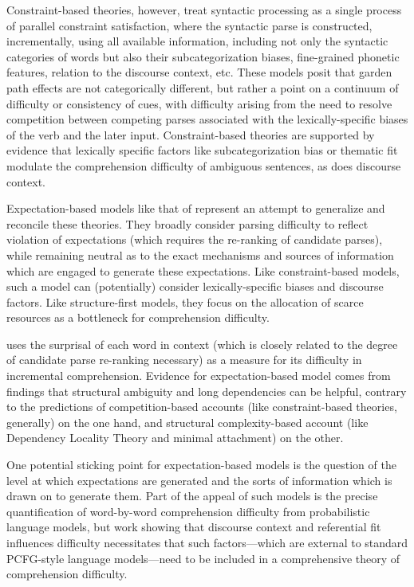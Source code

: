 \documentclass[11pt]{article}
\begin{document}
Constraint-based theories, however, treat syntactic processing as a single process of parallel constraint satisfaction, where the syntactic parse is constructed, incrementally, using all available information, including not only the syntactic categories of words but also their subcategorization biases, fine-grained phonetic features, relation to the discourse context, etc.  These models posit that garden path effects are not categorically different, but rather a point on a continuum of difficulty or consistency of cues, with difficulty arising from the need to resolve competition between competing parses associated with the lexically-specific biases of the verb and the later input.  Constraint-based theories are supported by evidence that lexically specific factors like subcategorization bias or thematic fit modulate the comprehension difficulty of ambiguous sentences, as does discourse context.

Expectation-based models like that of  represent an attempt to generalize and reconcile these theories.  They broadly consider parsing difficulty to reflect violation of expectations (which requires the re-ranking of candidate parses), while remaining neutral as to the exact mechanisms and sources of information which are engaged to generate these expectations.  Like constraint-based models, such a model can (potentially) consider lexically-specific biases and discourse factors.  Like structure-first models, they focus on the allocation of scarce resources as a bottleneck for comprehension difficulty.

 uses the surprisal of each word in context (which is closely related to the degree of candidate parse re-ranking necessary) as a measure for its difficulty in incremental comprehension.  Evidence for expectation-based model comes from findings that structural ambiguity and long dependencies can be helpful, contrary to the predictions of competition-based accounts (like constraint-based theories, generally) on the one hand, and structural complexity-based account (like Dependency Locality Theory and minimal attachment) on the other.

One potential sticking point for expectation-based models is the question of the level at which expectations are generated and the sorts of information which is drawn on to generate them.  Part of the appeal of such models is the precise quantification of word-by-word comprehension difficulty from probabilistic language models, but work showing that discourse context and referential fit influences difficulty necessitates that such factors---which are external to standard PCFG-style language models---need to be included in a comprehensive theory of comprehension difficulty.  
\end{document}
